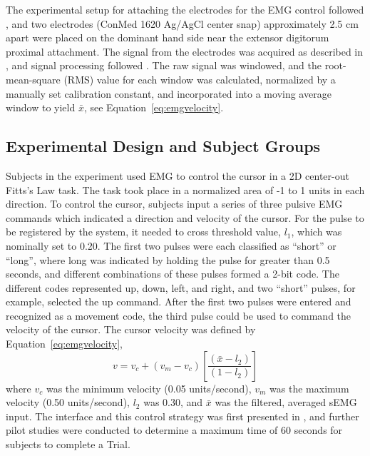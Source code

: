 The experimental setup for attaching the electrodes for the EMG control followed \citeauthor{RN44}, and two electrodes (ConMed 1620 Ag/AgCl center snap) approximately 2.5 cm apart were placed on the dominant hand side near the extensor digitorum proximal attachment.
The signal from the electrodes was acquired as described in \citet{RN44}, and signal processing followed \citet{RN45}.
The raw signal was windowed, and the root-mean-square (RMS) value for each window was calculated, normalized by a manually set calibration constant, and incorporated into a moving average window to yield $\bar{x}$, see Equation~\ref{eq:emgvelocity}.

\subsection{Experimental Design and Subject Groups}

Subjects in the experiment used EMG to control the cursor in a 2D center-out Fitts's Law task.
The task took place in a normalized area of -1 to 1 units in each direction.
To control the cursor, subjects input a series of three pulsive EMG commands which indicated a direction and velocity of the cursor.
For the pulse to be registered by the system, it needed to cross threshold value, $l_1$, which was nominally set to 0.20.
The first two pulses were each classified as ``short'' or ``long'', where long was indicated by holding the pulse for greater than 0.5 seconds, and different combinations of these pulses formed a 2-bit code.
The different codes represented up, down, left, and right, and two ``short'' pulses, for example, selected the up command.
After the first two pulses were entered and recognized as a movement code, the third pulse could be used to command the velocity of the cursor.
The cursor velocity was defined by Equation~\ref{eq:emgvelocity},
\begin{equation}
	\label{eq:emgvelocity}
	v= v_c+\left(v_m-v_c\right)\left[\frac{\left(\bar{x}-l_2\right)}{\left(1-l_2\right)}\right]
\end{equation}
where $v_c$ was the minimum velocity (0.05 units/second), $v_m$ was the maximum velocity (0.50 units/second), $l_2$ was 0.30, and $\bar{x}$ was the filtered, averaged sEMG input.
The interface and this control strategy was first presented in \citet{RN45}, and further pilot studies were conducted to determine a maximum time of 60 seconds for subjects to complete a Trial.

